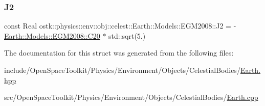 \subsubsection{\texorpdfstring{J2}{J2}}
{\footnotesize\ttfamily const Real ostk\+::physics\+::env\+::obj\+::celest\+::\+Earth\+::\+Models\+::\+E\+G\+M2008\+::\+J2 = -\/\hyperlink{structostk_1_1physics_1_1env_1_1obj_1_1celest_1_1_earth_1_1_models_1_1_e_g_m2008_a0f6ab7acf82079be89804e6b0eb28482}{Earth\+::\+Models\+::\+E\+G\+M2008\+::\+C20} $\ast$ std\+::sqrt(5.)\hspace{0.3cm}{\ttfamily [static]}}



The documentation for this struct was generated from the following files\+:\begin{DoxyCompactItemize}
\item 
include/\+Open\+Space\+Toolkit/\+Physics/\+Environment/\+Objects/\+Celestial\+Bodies/\hyperlink{_objects_2_celestial_bodies_2_earth_8hpp}{Earth.\+hpp}\item 
src/\+Open\+Space\+Toolkit/\+Physics/\+Environment/\+Objects/\+Celestial\+Bodies/\hyperlink{_objects_2_celestial_bodies_2_earth_8cpp}{Earth.\+cpp}\end{DoxyCompactItemize}
